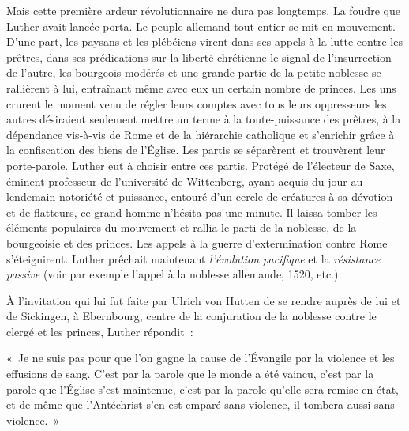 \documentclass[french,twoside]{book} %
\newenvironment{quoteblock}%
  {\begin{quoting}}
  {\end{quoting}}
\newenvironment{quotebar}{%
    \def\FrameCommand{{\color{rubric!10!}\vrule width 0.5em} \hspace{0.9em}}%
    \def\OuterFrameSep{\itemsep} %
    \MakeFramed {\advance\hsize-\width \FrameRestore}
  }%
  {%
    \endMakeFramed
  }
\renewenvironment{quoteblock}%
  {%
    \savenotes
    \setstretch{0.9}
    \normalfont
    \begin{quotebar}
  }
  {%
    \end{quotebar}
    \spewnotes
  }
\begin{document}
\noindent Mais cette première ardeur révolutionnaire ne dura pas longtemps. La foudre que Luther avait lancée porta. Le peuple allemand tout entier se mit en mouvement. D’une part, les paysans et les plébéiens virent dans ses appels à la lutte contre les prêtres, dans ses prédications sur la liberté chrétienne le signal de l’insurrection de l’autre, les bourgeois modérés et une grande partie de la petite noblesse se rallièrent à lui, entraînant même avec eux un certain nombre de princes. Les uns crurent le moment venu de régler leurs comptes avec tous leurs oppresseurs les autres désiraient seulement mettre un terme à la toute-puissance des prêtres, à la dépendance vis-à-vis de Rome et de la hiérarchie catholique et s’enrichir grâce à la confiscation des biens de l’Église. Les partis se séparèrent et trouvèrent leur porte-parole. Luther eut à choisir entre ces partis. Protégé de l’électeur de Saxe, éminent professeur de l’université de Wittenberg, ayant acquis du jour au lendemain notoriété et puissance, entouré d’un cercle de créatures à sa dévotion et de flatteurs, ce grand homme n’hésita pas une minute. Il laissa tomber les éléments populaires du mouvement et rallia le parti de la noblesse, de la bourgeoisie et des princes. Les appels à la guerre d’extermination contre Rome s’éteignirent. Luther prêchait maintenant \emph{l’évolution pacifique} et la \emph{résistance passive} (voir par exemple l’appel à la noblesse allemande, 1520, etc.).\par
À l’invitation qui lui fut faite par Ulrich von Hutten de se rendre auprès de lui et de Sickingen, à Ebernbourg, centre de la conjuration de la noblesse contre le clergé et les princes, Luther répondit :\par

\begin{quoteblock}
 \noindent « Je ne suis pas pour que l’on gagne la cause de l’Évangile par la violence et les effusions de sang. C’est par la parole que le monde a été vaincu, c’est par la parole que l’Église s’est maintenue, c’est par la parole qu’elle sera remise en état, et de même que l’Antéchrist s’en est emparé sans violence, il tombera aussi sans violence. »
\end{quoteblock}
\end{document}
